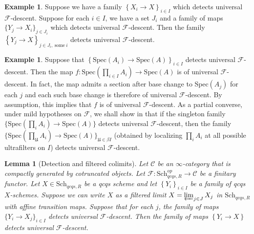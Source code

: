 \documentclass[reqno]{amsart}
\newtheorem{lemma}[theorem]{Lemma}
\theoremstyle{definition}
\newtheorem{example}[theorem]{Example}
\begin{document}
\begin{example} 
Suppose we have a family $\left\{X_i \to X\right\}_{i \in I}$ which detects
universal $\mathcal{F}$-descent. Suppose for each
$i \in I$, we have a set $J_i$ and a family of maps $\{Y_j \to X_i\}_{ j \in
J_i}$ which detects universal $\mathcal{F}$-descent. 
Then the family $\left\{Y_j \to X\right\}_{j \in J_i, \  \mathrm{some} \ i}$
detects universal $\mathcal{F}$-descent. 
\label{transitivityofdetect}
\end{example} 

\begin{example} 
\label{F2ex}
\label{detectsimpliesproductF}
Suppose that $\left\{\mathrm{Spec}(A_i)\to \mathrm{Spec}(A)\right\}_{i \in I}$ detects universal $\mathcal{F}$-descent. 
Then the map $f\colon  \mathrm{Spec}( \prod_{i \in I} A_i) \to \mathrm{Spec}(A)$ is of universal $\mathcal{F}$-descent. In fact,
the map admits a section after base change to $\mathrm{Spec}(A_j)$ for each $j$ and
each such base change is therefore of universal $\mathcal{F}$-descent. By
assumption, this implies that $f$ is of universal $\mathcal{F}$-descent. As a
partial converse, under mild hypotheses on $\mathcal{F}$, we shall show in
 that if the singleton family $\{\mathrm{Spec}(\prod_i A_i) \to \mathrm{Spec}(A)\}$ detects universal $\mathcal{F}$-descent, then the family $\{\mathrm{Spec}(\prod_{\mathfrak{U}} A_i) \to \mathrm{Spec}(A)\}_{\mathfrak{U} \in \beta I}$ (obtained by localizing $\prod_i A_i$ at all possible ultrafilters on $I$) detects universal $\mathcal{F}$-descent. 
\end{example} 



\begin{lemma}[Detection and filtered colimits] 
\label{detectfiltcolimit}
Let $\mathcal{C}$ be an $\infty$-category
that is compactly generated by cotruncated objects. 
Let $\mathcal{F}\colon  \mathrm{Sch}_{qcqs,R}^{op} \to \mathcal{C}$ be a finitary functor. 
Let $X \in \mathrm{Sch}_{qcqs,R}$ be a qcqs scheme and let $\left\{Y_i\right\}_{i \in I}$ be a family of
qcqs $X$-schemes. Suppose we can write $X$ as a filtered limit $X = \varprojlim_{j
\in J} X_j$ in $\mathrm{Sch}_{qcqs,R}$ with affine transition maps. Suppose that 
for each $j$, the family of maps $\{Y_i \to X_j\}_{i \in I}$ detects
universal $\mathcal{F}$-descent. 
Then the family of maps $\left\{Y_i \to X\right\}$ detects universal $\mathcal{F}$-descent. 
\end{lemma} 
\end{document}
